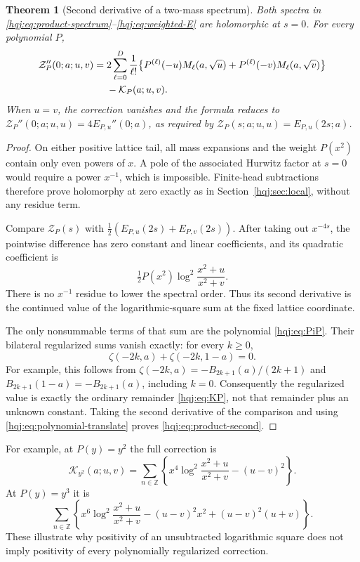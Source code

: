 \documentclass[11pt,letterpaper]{article}
\numberwithin{equation}{section}
\newtheorem{theorem}{Theorem}[section]
\theoremstyle{definition}
\newcommand{\Z}{\mathbb Z}
\begin{document}
\begin{theorem}[Second derivative of a two-mass spectrum]
\label{hqj:thm:product}
Both spectra in \eqref{hqj:eq:product-spectrum}--\eqref{hqj:eq:weighted-E}
are holomorphic at $s=0$. For every polynomial $P$,
\begin{align}
\mathcal Z_P''(0;a;u,v)
={}&2\sum_{\ell=0}^D\frac1{\ell!}
\bigl\{P^{(\ell)}(-u)M_\ell(a,\sqrt u)
+P^{(\ell)}(-v)M_\ell(a,\sqrt v)\bigr\}
\notag\\
&-\mathcal K_P(a;u,v).
\label{hqj:eq:product-second}
\end{align}
When $u=v$, the correction vanishes and the formula reduces to
$\mathcal Z_P''(0;a;u,u)=4E_{P,u}''(0;a)$, as required by
$\mathcal Z_P(s;a;u,u)=E_{P,u}(2s;a)$.
\end{theorem}
\begin{proof}
On either positive lattice tail, all mass expansions and the weight
$P(x^2)$ contain only even powers of $x$. A pole of the associated
Hurwitz factor at $s=0$ would require a power $x^{-1}$, which is
impossible. Finite-head subtractions therefore prove holomorphy at
zero exactly as in Section~\ref{hqj:sec:local}, without any residue
term.

Compare $\mathcal Z_P(s)$ with
$\tfrac12(E_{P,u}(2s)+E_{P,v}(2s))$. After taking out $x^{-4s}$,
the pointwise difference has zero constant and linear coefficients,
and its quadratic coefficient is
\[
\tfrac12P(x^2)\log^2\frac{x^2+u}{x^2+v}.
\]
There is no $x^{-1}$ residue to lower the spectral order. Thus its
second derivative is the continued value of the logarithmic-square
sum at the fixed lattice coordinate.

The only nonsummable terms of that sum are the polynomial
\eqref{hqj:eq:PiP}. Their bilateral regularized sums vanish exactly:
for every $k\ge0$,
\begin{equation}\label{hqj:eq:even-polynomial-zero}
\zeta(-2k,a)+\zeta(-2k,1-a)=0.
\end{equation}
For example, this follows from
$\zeta(-2k,a)=-B_{2k+1}(a)/(2k+1)$ and
$B_{2k+1}(1-a)=-B_{2k+1}(a)$, including $k=0$.
Consequently the regularized value is exactly the ordinary remainder
\eqref{hqj:eq:KP}, not that remainder plus an unknown constant.
Taking the second derivative of the comparison and using
\eqref{hqj:eq:polynomial-translate} proves
\eqref{hqj:eq:product-second}.
\end{proof}

For example, at $P(y)=y^2$ the full correction is
\[
\mathcal K_{y^2}(a;u,v)=\sum_{n\in\Z}
\left\{x^4\log^2\frac{x^2+u}{x^2+v}-(u-v)^2\right\}.
\]
At $P(y)=y^3$ it is
\[
\sum_{n\in\Z}\left\{x^6\log^2\frac{x^2+u}{x^2+v}
-(u-v)^2x^2+(u-v)^2(u+v)\right\}.
\]
These illustrate why positivity of an unsubtracted logarithmic square
does not imply positivity of every polynomially regularized correction.
\end{document}
